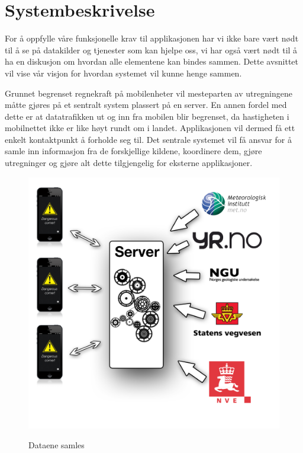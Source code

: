 \documentclass[a4paper,norsk,oneside]{book}
\begin{document}
\section{Systembeskrivelse}
\label{sec:Systembeskrivelse}

For å oppfylle våre funksjonelle krav til applikasjonen har vi ikke bare vært nødt til å se på datakilder og tjenester som kan hjelpe oss, vi har også vært nødt til å ha en diskusjon om hvordan alle elementene kan bindes sammen. Dette avsnittet vil vise vår visjon for hvordan systemet vil kunne henge sammen.

Grunnet begrenset regnekraft på mobilenheter vil mesteparten av utregningene måtte gjøres på et sentralt system plassert på en server. En annen fordel med dette er at datatrafikken ut og inn fra mobilen blir begrenset, da hastigheten i mobilnettet ikke er like høyt rundt om i landet. Applikasjonen vil dermed få ett enkelt kontaktpunkt å forholde seg til. Det sentrale systemet vil få ansvar for å samle inn informasjon fra de forskjellige kildene, koordinere dem, gjøre utregninger og gjøre alt dette tilgjengelig for eksterne applikasjoner.

\begin{figure}[H]
\centering
\includegraphics[scale=0.25]{figs/ark.png}
\label{fig:ark1}
\caption{Dataene samles}
\end{figure}
\end{document}
